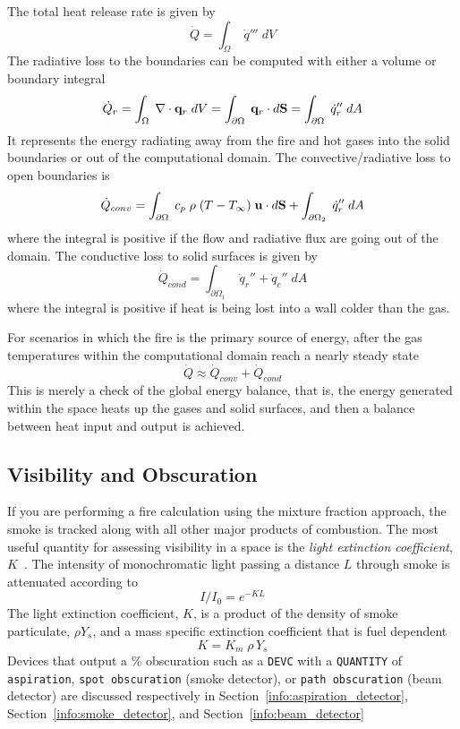 \documentclass[11pt]{book}
\newcommand{\ct}{\tt\small}
\newcommand{\dS}{{d\bf S}}
\newcommand{\dA}{{dA}}
\newcommand{\bq}{{\bf q}}
\newcommand{\bu}{{\bf u}}
\newcommand{\dq}{\dot{q}}
\newcommand{\be}{\begin{equation}}
\newcommand{\ee}{\end{equation}}
\begin{document}
The total heat release rate is given by
\be \dot{Q} = \int_\Omega \; \dq''' \; dV \ee
The radiative loss to the
boundaries can be computed with either a volume or boundary integral
\be \dot{Q}_r = \int_\Omega \; \nabla \cdot \bq_r \; dV =
\int_{\partial \Omega} \; \bq_r \cdot \dS = \int_{\partial \Omega} \; \dq_r'' \; \dA \ee
It represents the energy radiating away from the fire and hot gases into
the solid boundaries or out of the computational domain. The convective/radiative
loss to open boundaries is
\be \dot{Q}_{conv} =  \int_{\partial \Omega} \; c_p \; \rho \; (T-T_\infty) \; \bu \cdot \dS
   + \int_{\partial \Omega_2} \; \dq_r'' \; \dA  \ee
where the integral is positive if the flow and radiative flux are going out of the domain.
The conductive loss to solid surfaces is given by
\be \dot{Q}_{cond} = \int_{\partial \Omega_1} \; \dq_r'' + \dq_c'' \; \dA  \ee
where the integral is positive if heat is being lost into a wall colder
than the gas.

For scenarios in which the fire is the primary source of energy, after the gas temperatures
within the computational domain reach a nearly steady state
\be \dot{Q} \approx \dot{Q}_{conv} + \dot{Q}_{cond}  \ee
This is merely a check of the global energy balance, that is, the energy generated within the space
heats up the gases and solid surfaces, and then a balance between heat input and output is achieved.



\subsection{Visibility and Obscuration}
\label{info:visibility}
\label{info:obscuration}

If you are performing a fire calculation using the mixture fraction
approach, the smoke is tracked
along with all other major products of combustion. The most useful
quantity for assessing visibility in a space is the {\em light
extinction coefficient}, $K$~\cite{SFPE:Mulholland}. The intensity of
monochromatic light passing a distance $L$ through smoke
is attenuated according to
\be I/I_0 = e^{-KL} \ee
The light extinction coefficient, $K$, is a product of the
density of smoke particulate, $\rho Y_s$, and a mass specific
extinction coefficient that is fuel dependent
\be K = K_m \; \rho \, Y_s \label{mec} \ee
Devices that output a \% obscuration such as a {\ct DEVC} with a {\ct QUANTITY} of
{\ct aspiration}, {\ct spot obscuration} (smoke detector), or {\ct path obscuration} (beam detector)
are discussed respectively in Section~\ref{info:aspiration_detector}, Section~\ref{info:smoke_detector},
and Section~\ref{info:beam_detector}
\end{document}
